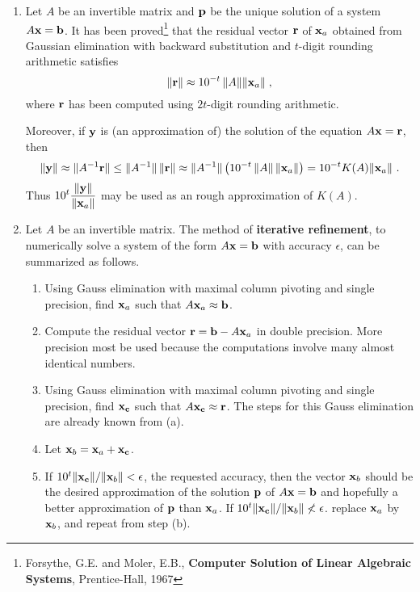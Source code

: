 \begin{rmkList}
\begin{enumerate}
\item Let $A$ be an invertible \nn matrix and $\mathbf{p}$ be
the unique solution of a system $A\mathbf{x} = \mathbf{b}$.  It has been
proved\footnote{Forsythe, G.E. and Moler, E.B., {\bfseries Computer
Solution of Linear Algebraic Systems}, Prentice-Hall, 1967} that the
residual vector $\mathbf{r}$ of $\mathbf{x}_a$ obtained from Gaussian
elimination with backward substitution and $t$-digit rounding arithmetic
satisfies
\[
\| \mathbf{r} \| \approx 10^{-t} \, \|A\| \| \mathbf{x}_a \| \; ,
\]
where $\mathbf{r}$ has been computed using $2t$-digit rounding arithmetic.

Moreover, if $\mathbf{y}$ is (an approximation of) the solution of the
equation $A\mathbf{x} = \mathbf{r}$, then
\[
\|\mathbf{y}\| \approx \|A^{-1} \mathbf{r}\| \leq \|A^{-1}\|\, \|\mathbf{r}\|
\approx \|A^{-1}\|\left( 10^{-t} \, \|A\|\, \| \mathbf{x}_a \| \right)
= 10^{-t} K(A) \|\mathbf{x}_a\| \ .
\]
Thus
$\displaystyle 10^t \frac{\|\mathbf{y}\|}{\|\mathbf{x}_a\|}$ may be used as
an rough approximation of $K(A)$.
\item Let $A$ be an invertible matrix.  The method of
{\bfseries iterative refinement}, to
numerically solve a system of the form $A\mathbf{x}=\mathbf{b}$ with
accuracy $\epsilon$, can be summarized as follows.
\begin{enumerate}
\item Using Gauss elimination with maximal column pivoting and single
precision, find $\mathbf{x}_a$ such that $A\mathbf{x}_a \approx \mathbf{b}$.
\item Compute the residual vector $\mathbf{r} = \mathbf{b}-A\mathbf{x}_a$ in
double precision.  More precision most be used because the
computations involve many almost identical numbers.
\item Using Gauss elimination with maximal column pivoting and single
precision, find $\mathbf{x_c}$ such that $A\mathbf{x_c} \approx \mathbf{r}$.
The steps for this Gauss elimination are already known from (a).
\item Let $\mathbf{x}_b = \mathbf{x}_a + \mathbf{x_c}$.
\item If $10^t \|\mathbf{x_c}\|/\|\mathbf{x}_b\| < \epsilon$, the
requested accuracy, then the vector $\mathbf{x}_b$ should be the desired
approximation of the solution $\mathbf{p}$ of $A\mathbf{x}=\mathbf{b}$ and
hopefully a better approximation of $\mathbf{p}$ than $\mathbf{x}_a$.
If $10^t \|\mathbf{x_c}\|/\|\mathbf{x}_b\| \not< \epsilon$.
replace $\mathbf{x}_a$ by $\mathbf{x}_b$, and repeat from step (b).
\end{enumerate}
\end{enumerate}
\end{rmkList}


